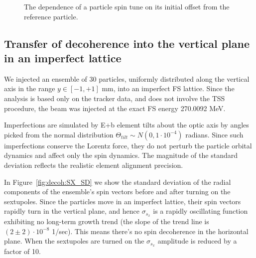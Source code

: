 \begin{figure}[!h]\centering
	\caption{The dependence of a particle spin tune on its initial offset
          from the reference particle.\label{fig:decoh:perfect}}
\end{figure}

\subsection{Transfer of decoherence into the vertical plane in an imperfect lattice}
We injected an ensemble of 30 particles, uniformly distributed along the vertical axis in the range
$y \in [-1, +1]$ mm, into an imperfect FS lattice. Since the analysis is based only on the tracker data,
and does not involve the TSS procedure, the beam was injected at the exact FS energy 270.0092 MeV.

Imperfections are simulated by E+b element tilts about the optic axis by angles picked from the normal
distribution $\Theta_{tilt} \sim N(0, 1\cdot 10^{-4})$ radians. Since such imperfections conserve the
Lorentz force, they do not perturb the particle orbital dynamics and affect only the spin dynamics.
The magnitude of the standard deviation reflects the realistic element alignment precision.

In Figure~\ref{fig:decoh:SX_SD} we show the standard deviation of the radial components of
the ensemble's spin vectors before and after turning on the sextupoles.
Since the particles move in an imperfect lattice, their spin vectors rapidly turn in the vertical plane,
and hence $\sigma_{s_x}$ is a rapidly oscillating function exhibiting no long-term growth trend
(the slope of the trend line is $(2\pm2)\cdot 10^{-8}$ 1/sec). This means there's no spin decoherence
in the horizontal plane. When the sextupoles are turned on the $\sigma_{s_x}$ amplitude is reduced by
a factor of 10.


